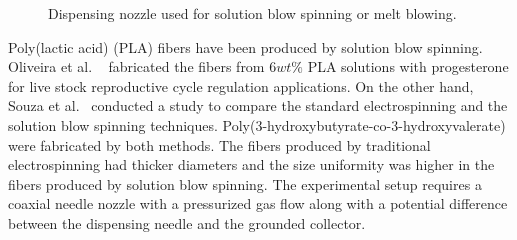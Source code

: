 \documentclass[5p,,preprint,12pt,twocolumn]{elsarticle}
\makeatletter
\def\fixFloatSize#1{}%
\makeatother
\begin{document}
\bgroup
\fixFloatSize{images/87246522-4cf1-491f-a45f-cda541854d72-uimg_blow_es.png}
\begin{figure}[!htbp]
\centering \makeatletter{}
\makeatother 
\caption{{Dispensing nozzle used for solution blow spinning or melt blowing. \unskip~\protect\cite{527120:13538056}}}
\label{f-92361290d8c3}
\end{figure}
\egroup
Poly(lactic acid) (PLA) fibers have been produced by solution blow spinning. Oliveira et al. \unskip~\cite{527120:13539278} fabricated the fibers from $6 wt\% $ PLA solutions with progesterone for live stock reproductive cycle regulation applications. On the other hand, Souza et al.\unskip~\cite{527120:13538056} conducted a study to compare the standard electrospinning and the solution blow spinning techniques. Poly(3-hydroxybutyrate-co-3-hydroxyvalerate) were fabricated by both methods. The fibers produced by traditional electrospinning had thicker diameters and the size uniformity was higher in the fibers produced by solution blow spinning. The experimental setup requires a coaxial needle nozzle with a pressurized gas flow along with a potential difference between the dispensing needle and the grounded collector.
\end{document}
